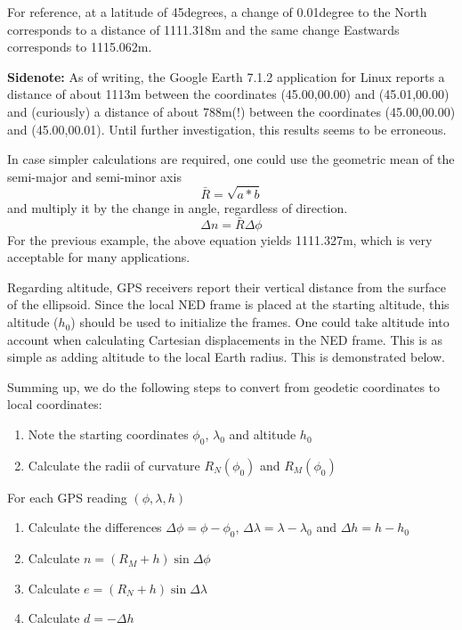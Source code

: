 For reference, at a latitude of 45degrees, a change of 0.01degree to the North corresponds to a distance of 1111.318m and the same change Eastwards corresponds to 1115.062m.

\textbf{Sidenote:} As of writing, the Google Earth 7.1.2 application for Linux reports a distance of about 1113m between the coordinates (45.00,00.00) and (45.01,00.00) and (curiously) a distance of about 788m(!) between the coordinates (45.00,00.00) and (45.00,00.01). Until further investigation, this results seems to be erroneous.

In case simpler calculations are required, one could use the geometric mean of the semi-major and semi-minor axis
\begin{equation}
	\bar{R} = \sqrt{a*b}
\end{equation}
and multiply it by the change in angle, regardless of direction.
\begin{equation}
	\Delta n = \bar{R} \Delta \phi
\end{equation}
For the previous example, the above equation yields 1111.327m, which is very acceptable for many applications.

Regarding altitude, GPS receivers report their vertical distance from the surface of the ellipsoid. Since the local NED frame is placed at the starting altitude, this altitude ($h_0$) should be used to initialize the frames. One could take altitude into account when calculating Cartesian displacements in the NED frame. This is as simple as adding altitude to the local Earth radius. This is demonstrated below.

Summing up, we do the following steps to convert from geodetic coordinates to local coordinates:
\begin{enumerate}
	\item Note the starting coordinates $\phi_0$, $\lambda_0$ and altitude $h_0$
	\item Calculate the radii of curvature $R_N(\phi_0)$ and $R_M(\phi_0)$
\end{enumerate}
For each GPS reading $(\phi, \lambda, h)$
\begin{enumerate}
	\item Calculate the differences $\Delta \phi = \phi - \phi_0$, $\Delta \lambda = \lambda - \lambda_0$ and $\Delta h = h - h_0$
	\item Calculate $n = (R_M + h) \sin \Delta \phi$
	\item Calculate $e = (R_N + h) \sin \Delta \lambda$
	\item Calculate $d = -\Delta h$
\end{enumerate}

